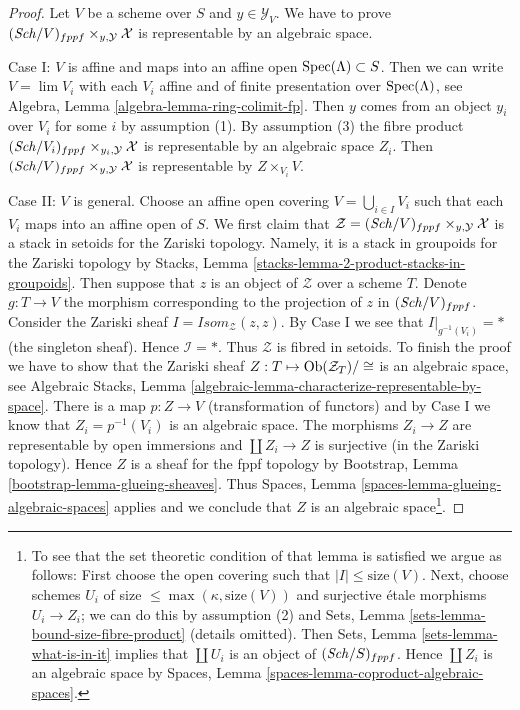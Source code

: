 \begin{proof}
Let $V$ be a scheme over $S$ and $y \in \mathcal{Y}_V$. We have to prove
$(\mathit{Sch}/V)_{fppf} \times_{y, \mathcal{Y}} \mathcal{X}$ is representable
by an algebraic space.

\medskip\noindent
Case I: $V$ is affine and maps into an affine open $\mathop{\mathrm{Spec}}(\Lambda) \subset S$.
Then we can write $V = \lim V_i$ with each $V_i$ affine and of finite
presentation over $\mathop{\mathrm{Spec}}(\Lambda)$, see
Algebra, Lemma \ref{algebra-lemma-ring-colimit-fp}.
Then $y$ comes from an object $y_i$ over $V_i$ for some $i$ by assumption (1).
By assumption (3) the fibre product
$(\mathit{Sch}/V_i)_{fppf} \times_{y_i, \mathcal{Y}} \mathcal{X}$ is representable
by an algebraic space $Z_i$. Then 
$(\mathit{Sch}/V)_{fppf} \times_{y, \mathcal{Y}} \mathcal{X}$ is representable
by $Z \times_{V_i} V$.

\medskip\noindent
Case II: $V$ is general. Choose an affine open covering
$V = \bigcup_{i \in I} V_i$ such that each $V_i$ maps into an affine open
of $S$. We first claim
that $\mathcal{Z} = (\mathit{Sch}/V)_{fppf} \times_{y, \mathcal{Y}} \mathcal{X}$
is a stack in setoids for the Zariski topology. Namely, it is a stack in
groupoids for the Zariski topology by
Stacks, Lemma \ref{stacks-lemma-2-product-stacks-in-groupoids}.
Then suppose that $z$ is an object of $\mathcal{Z}$ over a scheme $T$.
Denote $g : T \to V$ the morphism corresponding to the
projection of $z$ in $(\mathit{Sch}/V)_{fppf}$. Consider the Zariski sheaf
$\mathit{I} = \mathit{Isom}_{\mathcal{Z}}(z, z)$. By Case I we see that
$\mathit{I}|_{g^{-1}(V_i)} = *$ (the singleton sheaf). Hence
$\mathcal{I} = *$. Thus $\mathcal{Z}$ is fibred in setoids. To finish
the proof we have to show that the Zariski sheaf
$Z : T \mapsto \mathop{\mathrm{Ob}}\nolimits(\mathcal{Z}_T)/\cong$ is an algebraic space, see
Algebraic Stacks, Lemma
\ref{algebraic-lemma-characterize-representable-by-space}.
There is a map $p : Z \to V$ (transformation of functors) and by Case I
we know that $Z_i = p^{-1}(V_i)$ is an algebraic space. The morphisms
$Z_i \to Z$ are representable by open immersions and
$\coprod Z_i \to Z$ is surjective (in the Zariski topology).
Hence $Z$ is a sheaf for the fppf topology by
Bootstrap, Lemma \ref{bootstrap-lemma-glueing-sheaves}.
Thus Spaces, Lemma \ref{spaces-lemma-glueing-algebraic-spaces}
applies and we conclude that $Z$ is an algebraic space\footnote{
To see that the set theoretic condition of that lemma is satisfied
we argue as follows: First choose the open covering such that
$|I| \leq \text{size}(V)$. Next, choose schemes $U_i$ of size
$\leq \max(\kappa, \text{size}(V))$ and surjective \'etale morphisms
$U_i \to Z_i$; we can do this by assumption (2) and
Sets, Lemma \ref{sets-lemma-bound-size-fibre-product}
(details omitted). Then
Sets, Lemma \ref{sets-lemma-what-is-in-it}
implies that $\coprod U_i$ is an object of $(\mathit{Sch}/S)_{fppf}$.
Hence $\coprod Z_i$ is an algebraic space by
Spaces, Lemma \ref{spaces-lemma-coproduct-algebraic-spaces}.
}.
\end{proof}


